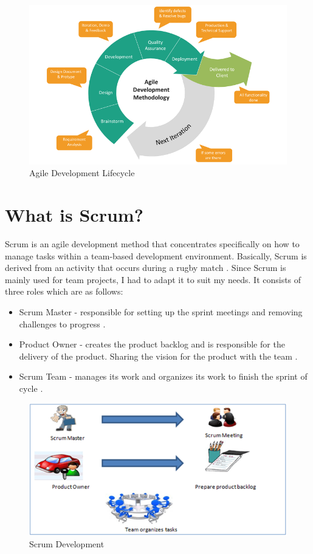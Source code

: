 \begin{figure}[h]
\centering
\includegraphics[scale=0.4]{img/agile-development-chart.png}
\caption{Agile Development Lifecycle}
\label{Agile}
\end{figure}


\newpage

\section{What is Scrum?}
Scrum is an agile development method that concentrates specifically on how to manage tasks within a team-based development environment. Basically, Scrum is derived from an activity that occurs during a rugby match \cite{Agile}. Since Scrum is mainly used for team projects, I had to adapt it to suit my needs. It consists of three roles which are as follows:

\begin{itemize}
    \item Scrum Master - responsible for setting up the sprint meetings and removing challenges to progress \cite{Agile}.
    \item Product Owner -  creates the product backlog and is responsible for the delivery of the product. Sharing the vision for the product with the team \cite{Agile}.
    \item Scrum Team - manages its work and organizes its work to finish the sprint of cycle \cite{Agile}.
\end{itemize}

\begin{figure}[h]
\centering
\includegraphics[scale=0.4]{img/scrum.png}
\caption{Scrum Development}
\label{Scrum}
\end{figure}

